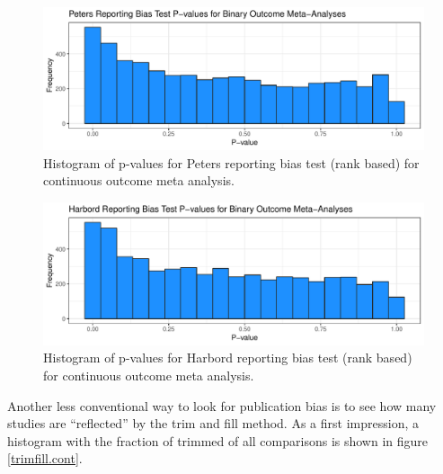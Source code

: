\documentclass[11pt,a4paper,twoside]{book}\usepackage[]{graphicx}\usepackage[]{color}
\newenvironment{knitrout}{}{} %
\begin{document}
\begin{figure}
\begin{knitrout}
\color{fgcolor}

{\centering \includegraphics[width=\textwidth-3cm]{figure/ch02_figunnamed-chunk-20-1} 

}



\end{knitrout}
\caption{Histogram of p-values for Peters reporting bias test (rank based) for continuous outcome meta analysis.}
\label{peters.bin}
\end{figure}


\begin{figure}
\begin{knitrout}
\color{fgcolor}

{\centering \includegraphics[width=\textwidth-3cm]{figure/ch02_figunnamed-chunk-21-1} 

}



\end{knitrout}
\caption{Histogram of p-values for Harbord reporting bias test (rank based) for continuous outcome meta analysis.}
\label{harbord.bin}
\end{figure}




Another less conventional way to look for publication bias is to see how many studies are ``reflected'' by the trim and fill method. As a first impression, a histogram with the fraction of trimmed of all comparisons is shown in figure \ref{trimfill.cont}. 
\end{document}

